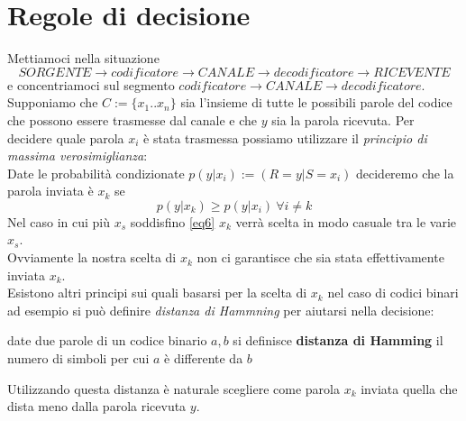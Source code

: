 \section{Regole di decisione}
Mettiamoci nella situazione
$$ SORGENTE \to codificatore \to CANALE \to decodificatore \to RICEVENTE$$
e concentriamoci sul segmento $codificatore \to CANALE \to decodificatore$.\\
Supponiamo che $C:=\{ x_1 ..x_n \}$ sia l'insieme di tutte le possibili parole del codice che possono essere trasmesse dal canale e che $y$ sia la parola ricevuta. Per decidere quale parola $x_i$ è stata trasmessa possiamo utilizzare il \textit{principio di massima verosimiglianza}:\\
Date le probabilità condizionate $p(y|x_i):=(R=y|S=x_i)$ decideremo che la parola inviata è $x_k$ se
\begin{equation} \label{eq6}
p(y|x_k )\geq p(y|x_i) \ \forall i\neq k
\end{equation}
Nel caso in cui più $x_s$ soddisfino \ref{eq6} $x_k$ verrà scelta in modo casuale tra le varie $x_s$.\\
Ovviamente la nostra scelta di $x_k$ non ci garantisce che sia stata effettivamente inviata $x_k$.\\
Esistono altri principi sui quali basarsi per la scelta di $x_k$ nel caso di codici binari ad esempio si può definire \textit{distanza di Hammning} per aiutarsi nella decisione:
\begin{defi}
date due parole di un codice binario $a,b$ si definisce \textbf{distanza di Hamming} il numero di simboli per cui $a$ è differente da $b$
\end{defi}
Utilizzando questa distanza è naturale scegliere come parola $x_k$ inviata quella che dista meno dalla parola ricevuta $y$.

